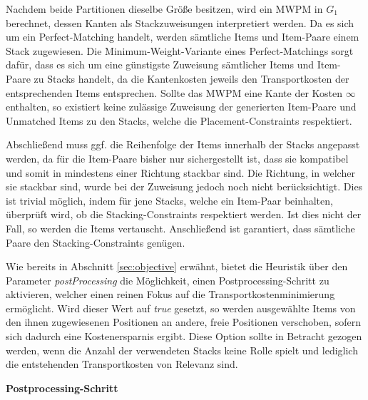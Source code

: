 Nachdem beide Partitionen dieselbe Größe besitzen, wird ein \textsc{MWPM} in $G_1$ berechnet, dessen Kanten als
Stackzuweisungen interpretiert werden. Da es sich um ein Perfect-Matching handelt, werden sämtliche Items und Item-Paare einem Stack zugewiesen. Die Minimum-Weight-Variante eines Perfect-Matchings sorgt dafür, dass es sich um eine günstigste Zuweisung sämtlicher Items und Item-Paare zu Stacks handelt, da die Kantenkosten jeweils den Transportkosten der entsprechenden Items entsprechen. Sollte das \textsc{MWPM} eine Kante der Kosten $\infty$ enthalten, so existiert keine zulässige Zuweisung der generierten Item-Paare und Unmatched Items zu den Stacks, welche die Placement-Constraints respektiert.

Abschließend muss ggf. die Reihenfolge der Items innerhalb der Stacks angepasst werden, da für die Item-Paare bisher nur sichergestellt ist, dass sie kompatibel und somit in mindestens einer Richtung stackbar sind. Die Richtung, in welcher sie stackbar sind, wurde bei der Zuweisung jedoch noch nicht berücksichtigt. Dies ist trivial möglich, indem für jene Stacks, welche ein Item-Paar beinhalten, überprüft wird, ob die Stacking-Constraints respektiert werden. Ist dies nicht der Fall, so werden die Items vertauscht. Anschließend ist garantiert, dass sämtliche Paare den Stacking-Constraints genügen.

Wie bereits in Abschnitt \ref{sec:objective} erwähnt, bietet die Heuristik über den Parameter
\textit{postProcessing} die Möglichkeit, einen Postprocessing-Schritt zu aktivieren, welcher einen reinen Fokus
auf die Transportkostenminimierung ermöglicht. Wird dieser Wert auf \textit{true} gesetzt, so werden
ausgewählte Items von den ihnen zugewiesenen Positionen an andere, freie Positionen verschoben,
sofern sich dadurch eine Kostenersparnis ergibt. Diese Option sollte in Betracht gezogen werden,
wenn die Anzahl der verwendeten Stacks keine Rolle spielt und lediglich die entstehenden Transportkosten
von Relevanz sind.

\textbf{Postprocessing-Schritt}

